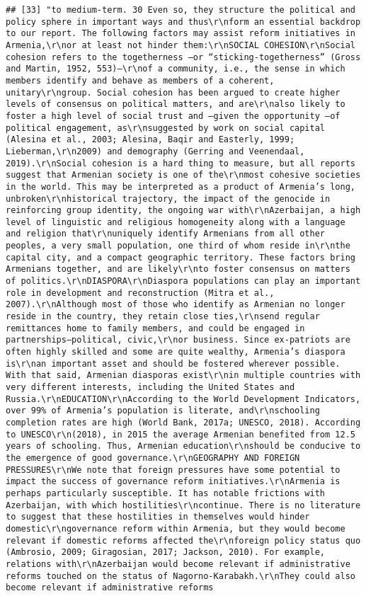 \documentclass[
]{article}
\begin{document}
\begin{verbatim}
## [33] "to medium-term. 30 Even so, they structure the political and policy sphere in important ways and thus\r\nform an essential backdrop to our report. The following factors may assist reform initiatives in Armenia,\r\nor at least not hinder them:\r\nSOCIAL COHESION\r\nSocial cohesion refers to the togetherness —or “sticking-togetherness” (Gross and Martin, 1952, 553)—\r\nof a community, i.e., the sense in which members identify and behave as members of a coherent, unitary\r\ngroup. Social cohesion has been argued to create higher levels of consensus on political matters, and are\r\nalso likely to foster a high level of social trust and —given the opportunity —of political engagement, as\r\nsuggested by work on social capital (Alesina et al., 2003; Alesina, Baqir and Easterly, 1999; Lieberman,\r\n2009) and demography (Gerring and Veenendaal, 2019).\r\nSocial cohesion is a hard thing to measure, but all reports suggest that Armenian society is one of the\r\nmost cohesive societies in the world. This may be interpreted as a product of Armenia’s long, unbroken\r\nhistorical trajectory, the impact of the genocide in reinforcing group identity, the ongoing war with\r\nAzerbaijan, a high level of linguistic and religious homogeneity along with a language and religion that\r\nuniquely identify Armenians from all other peoples, a very small population, one third of whom reside in\r\nthe capital city, and a compact geographic territory. These factors bring Armenians together, and are likely\r\nto foster consensus on matters of politics.\r\nDIASPORA\r\nDiaspora populations can play an important role in development and reconstruction (Mitra et al., 2007).\r\nAlthough most of those who identify as Armenian no longer reside in the country, they retain close ties,\r\nsend regular remittances home to family members, and could be engaged in partnerships—political, civic,\r\nor business. Since ex-patriots are often highly skilled and some are quite wealthy, Armenia’s diaspora is\r\nan important asset and should be fostered wherever possible. With that said, Armenian diasporas exist\r\nin multiple countries with very different interests, including the United States and Russia.\r\nEDUCATION\r\nAccording to the World Development Indicators, over 99% of Armenia’s population is literate, and\r\nschooling completion rates are high (World Bank, 2017a; UNESCO, 2018). According to UNESCO\r\n(2018), in 2015 the average Armenian benefited from 12.5 years of schooling. Thus, Armenian education\r\nshould be conducive to the emergence of good governance.\r\nGEOGRAPHY AND FOREIGN PRESSURES\r\nWe note that foreign pressures have some potential to impact the success of governance reform initiatives.\r\nArmenia is perhaps particularly susceptible. It has notable frictions with Azerbaijan, with which hostilities\r\ncontinue. There is no literature to suggest that these hostilities in themselves would hinder domestic\r\ngovernance reform within Armenia, but they would become relevant if domestic reforms affected the\r\nforeign policy status quo (Ambrosio, 2009; Giragosian, 2017; Jackson, 2010). For example, relations with\r\nAzerbaijan would become relevant if administrative reforms touched on the status of Nagorno-Karabakh.\r\nThey could also become relevant if administrative reforms 
\end{verbatim}
\end{document}
